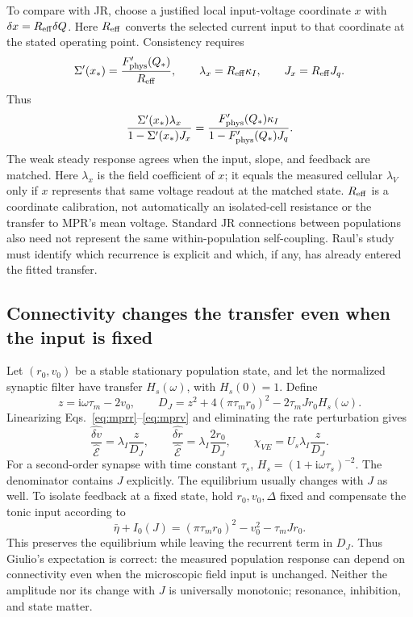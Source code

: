 \documentclass[11pt,a4paper]{article}
\newcommand{\ii}{\mathrm i}
\newcommand{\E}{\mathcal E}
\begin{document}
To compare with JR, choose a justified local input-voltage coordinate $x$ with $\delta x=R_{\rm eff}\delta Q$. Here $R_{\rm eff}$ converts the selected current input to that coordinate at the stated operating point. Consistency requires
\begin{equation}
\Sigma'(x_*)=\frac{F_{\rm phys}'(Q_*)}{R_{\rm eff}},\qquad
\lambda_x=R_{\rm eff}\kappa_I,\qquad
J_x=R_{\rm eff}J_q.
\end{equation}
Thus
\begin{equation}
\frac{\Sigma'(x_*)\lambda_x}{1-\Sigma'(x_*)J_x}
=\frac{F_{\rm phys}'(Q_*)\kappa_I}{1-F_{\rm phys}'(Q_*)J_q}.
\end{equation}
The weak steady response agrees when the input, slope, and feedback are matched. Here $\lambda_x$ is the field coefficient of $x$; it equals the measured cellular $\lambda_V$ only if $x$ represents that same voltage readout at the matched state. $R_{\rm eff}$ is a coordinate calibration, not automatically an isolated-cell resistance or the transfer to MPR's mean voltage. Standard JR connections between populations also need not represent the same within-population self-coupling. Raul's study must identify which recurrence is explicit and which, if any, has already entered the fitted transfer.

\subsection{Connectivity changes the transfer even when the input is fixed}

Let $(r_0,v_0)$ be a stable stationary population state, and let the normalized synaptic filter have transfer $H_s(\omega)$, with $H_s(0)=1$. Define
\begin{equation}
z=\ii\omega\tau_m-2v_0,\qquad
D_J=z^2+4(\pi\tau_mr_0)^2-2\tau_mJr_0H_s(\omega).
\end{equation}
Linearizing Eqs.~\eqref{eq:mprr}--\eqref{eq:mprv} and eliminating the rate perturbation gives
\begin{equation}
\frac{\widehat{\delta v}}{\widehat{\E}}=\lambda_I\frac{z}{D_J},
\qquad
\frac{\widehat{\delta r}}{\widehat{\E}}=\lambda_I\frac{2r_0}{D_J},
\qquad
\chi_{VE}=U_s\lambda_I\frac{z}{D_J}.
\label{eq:gain}
\end{equation}
For a second-order synapse with time constant $\tau_s$, $H_s=(1+\ii\omega\tau_s)^{-2}$. The denominator contains $J$ explicitly. The equilibrium usually changes with $J$ as well. To isolate feedback at a fixed state, hold $r_0,v_0,\Delta$ fixed and compensate the tonic input according to
\begin{equation}
\bar\eta+I_0(J)=(\pi\tau_mr_0)^2-v_0^2-\tau_mJr_0.
\label{eq:pin}
\end{equation}
This preserves the equilibrium while leaving the recurrent term in $D_J$. Thus Giulio's expectation is correct: the measured population response can depend on connectivity even when the microscopic field input is unchanged. Neither the amplitude nor its change with $J$ is universally monotonic; resonance, inhibition, and state matter.
\end{document}
